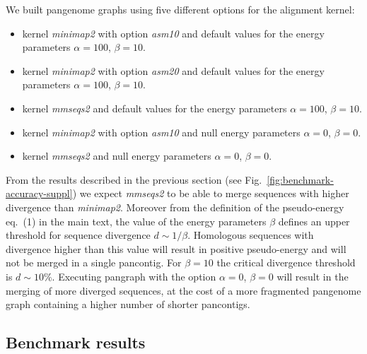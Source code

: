 \documentclass[aps,rmp,reprint,superscriptaddress,notitlepage,10pt,onecolumn]{revtex4-1}
\begin{document}
We built pangenome graphs using five different options for the alignment kernel:
\begin{itemize}
    \itemsep1pt
    \item kernel \textit{minimap2} with option \textit{asm10} and default values for the energy parameters $\alpha=100$, $\beta=10$.
    \item kernel \textit{minimap2} with option \textit{asm20} and default values for the energy parameters $\alpha=100$, $\beta=10$.
    \item kernel \textit{mmseqs2} and default values for the energy parameters $\alpha=100$, $\beta=10$.
    \item kernel \textit{minimap2} with option \textit{asm10} and null energy parameters $\alpha=0$, $\beta=0$.
    \item kernel \textit{mmseqs2} and null energy parameters $\alpha=0$, $\beta=0$.
\end{itemize}
From the results described in the previous section (see Fig.~\ref{fig:benchmark-accuracy-suppl}) we expect \textit{mmseqs2} to be able to merge sequences with higher divergence than \textit{minimap2}. Moreover from the definition of the pseudo-energy eq.~(1) in the main text, the value of the energy parameters $\beta$ defines an upper threshold for sequence divergence $d \sim 1/\beta$. Homologous sequences with divergence higher than this value will result in positive pseudo-energy and will not be merged in a single pancontig. For $\beta=10$ the critical divergence threshold is $d \sim 10\%$. Executing pangraph with the option $\alpha=0$, $\beta=0$ will result in the merging of more diverged sequences, at the cost of a more fragmented pangenome graph containing a higher number of shorter pancontigs.


\subsection{Benchmark results}
\end{document}
